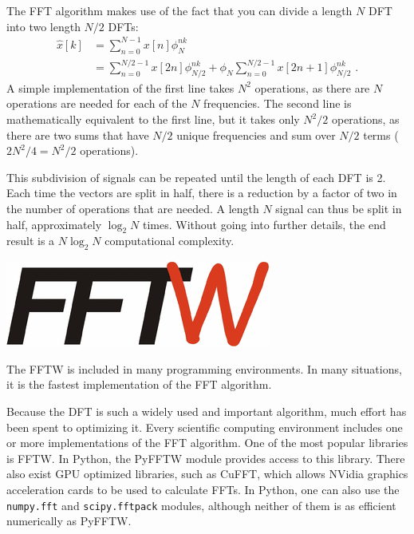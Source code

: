 The FFT algorithm makes use of the fact that you can divide a length
$N$ DFT into two length $N/2$ DFTs:
\begin{align}
\hat{x}[k] &= \sum_{n=0}^{N-1}x[n]\phi_N^{nk}\\
&=\sum_{n=0}^{N/2-1} x[2n]\phi_{N/2}^{nk} + \phi_{N}\sum_{n=0}^{N/2-1} x[2n+1]\phi_{N/2}^{nk} \,\,.
\end{align}
A simple implementation of the first line takes $N^2$ operations, as
there are $N$ operations are needed for each of the $N$
frequencies. The second line is mathematically equivalent to the first
line, but it takes only $N^2/2$ operations, as there are two sums that
have $N/2$ unique frequencies and sum over $N/2$ terms ($2N^2/4 =
N^2/2$ operations).

This subdivision of signals can be repeated until the length of each
DFT is 2. Each time the vectors are split in half, there is a
reduction by a factor of two in the number of operations that are
needed. A length $N$ signal can thus be split in half, approximately
$\log_2{N}$ times. Without going into further details, the end result
is a $N\log_2{N}$ computational complexity.%


\begin{marginfigure}
\begin{center}
\includegraphics[width=\textwidth]{ch15/figures/fftwlogo.png}
\end{center}
\caption{The FFTW is included in many programming environments. In many situations, it is the fastest implementation of the FFT algorithm.}
\end{marginfigure}
Because the DFT is such a widely used and important algorithm, much
effort has been spent to optimizing it. Every scientific computing
environment includes one or more implementations of the FFT
algorithm. One of the most popular libraries is FFTW. In Python, the
PyFFTW module provides access to this library. There also exist GPU
optimized libraries, such as CuFFT, which allows NVidia graphics
acceleration cards to be used to calculate FFTs. In Python, one can
also use the \verb|numpy.fft| and \verb|scipy.fftpack| modules,
although neither of them is as efficient numerically as PyFFTW.


